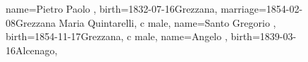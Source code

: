 \documentclass{article}
\begin{document}
\begin{figure}
\begin{minipage}[b]{0.39\textwidth}
\begin{genealogypicture}
{{{{{                        name={Pietro Paolo },
                        birth={1832-07-16}{Grezzana},
                        marriage={1854-02-08}{Grezzana \newline Maria Quintarelli},
                    }
                    c{
                        male,
                        name={Santo Gregorio },
                        birth={1854-11-17}{Grezzana},
                    }
                }
                c{
                    male,
                    name={Angelo },
                    birth={1839-03-16}{Alcenago},
                }
            }
        }
    }
    \end{genealogypicture}

\end{minipage}\label{fig:figure}
\end{figure}
\end{document}
